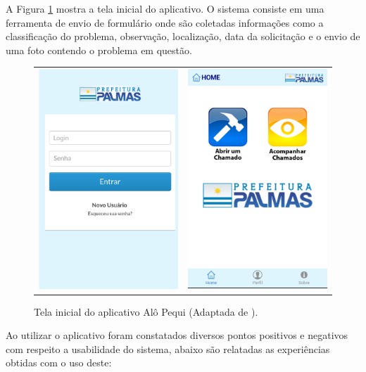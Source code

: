 A Figura \ref{alo-pequi} mostra a tela inicial do aplicativo. O sistema consiste em uma ferramenta de envio de formulário onde são coletadas informações como a classificação do problema, observação, localização, data da solicitação e o envio de uma foto contendo o problema em questão.

\begin{figure}[!h]
\centering
    \begin{tabular}{cc}
     \includegraphics[width=.40\textwidth]{figuras/login_alopequi.png}  &   \includegraphics[width=.40\textwidth]{figuras/tela-inicial-alo-pequi.png} 
    \end{tabular}
    \caption{Tela inicial do aplicativo Alô Pequi (Adaptada de \cite{alo_pequi}).}
    \label{alo-pequi}
\end{figure}

Ao utilizar o aplicativo foram constatados diversos pontos positivos e negativos com respeito a usabilidade do sistema, abaixo são relatadas as experiências obtidas com o uso deste:

